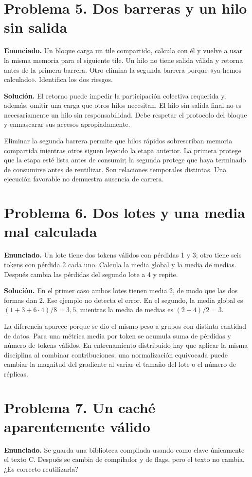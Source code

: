 \documentclass[12pt,a4paper,oneside]{report}
\begin{document}
\section{Problema 5. Dos barreras y un hilo sin salida}
\textbf{Enunciado.} Un bloque carga un tile compartido, calcula con él y vuelve a usar la misma memoria para el siguiente tile. Un hilo no tiene salida válida y retorna antes de la primera barrera. Otro elimina la segunda barrera porque «ya hemos calculado». Identifica los dos riesgos.

\textbf{Solución.} El retorno puede impedir la participación colectiva requerida y, además, omitir una carga que otros hilos necesitan. El hilo sin salida final no es necesariamente un hilo sin responsabilidad. Debe respetar el protocolo del bloque y enmascarar sus accesos apropiadamente.

Eliminar la segunda barrera permite que hilos rápidos sobrescriban memoria compartida mientras otros siguen leyendo la etapa anterior. La primera protege que la etapa esté lista antes de consumir; la segunda protege que haya terminado de consumirse antes de reutilizar. Son relaciones temporales distintas. Una ejecución favorable no demuestra ausencia de carrera.

\section{Problema 6. Dos lotes y una media mal calculada}
\textbf{Enunciado.} Un lote tiene dos tokens válidos con pérdidas 1 y 3; otro tiene seis tokens con pérdida 2 cada uno. Calcula la media global y la media de medias. Después cambia las pérdidas del segundo lote a 4 y repite.

\textbf{Solución.} En el primer caso ambos lotes tienen media 2, de modo que las dos formas dan 2. Ese ejemplo no detecta el error. En el segundo, la media global es $(1+3+6\cdot4)/8=3,5$, mientras la media de medias es $(2+4)/2=3$.

La diferencia aparece porque se dio el mismo peso a grupos con distinta cantidad de datos. Para una métrica media por token se acumula suma de pérdidas y número de tokens válidos. En entrenamiento distribuido hay que aplicar la misma disciplina al combinar contribuciones; una normalización equivocada puede cambiar la magnitud del gradiente al variar el tamaño del lote o el número de réplicas.

\section{Problema 7. Un caché aparentemente válido}
\textbf{Enunciado.} Se guarda una biblioteca compilada usando como clave únicamente el texto C. Después se cambia de compilador y de flags, pero el texto no cambia. ¿Es correcto reutilizarla?
\end{document}

